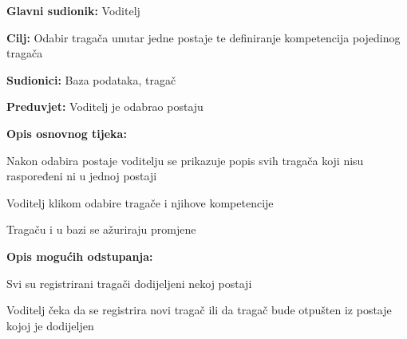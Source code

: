 					\noindent {}
					\begin{packed_item}
						
						\item \textbf{Glavni sudionik: } Voditelj
						\item  \textbf{Cilj:} Odabir tragača unutar jedne postaje te definiranje kompetencija pojedinog tragača
						\item  \textbf{Sudionici:} Baza podataka, tragač
						\item  \textbf{Preduvjet:} Voditelj je odabrao postaju
						\item  \textbf{Opis osnovnog tijeka:}
						
						\item[] \begin{packed_enum}
							
							\item Nakon odabira postaje voditelju se prikazuje popis svih tragača koji nisu raspoređeni ni u jednoj postaji
							\item Voditelj klikom odabire tragače i njihove kompetencije
							\item Tragaču i u bazi se ažuriraju promjene
						\end{packed_enum}
						
						\item  \textbf{Opis mogućih odstupanja:}
						
						\item[] \begin{packed_item}
							
							\item[2.a] Svi su registrirani tragači dodijeljeni nekoj postaji 
							\item[] \begin{packed_enum}
								
								\item  Voditelj čeka da se registrira novi tragač ili da tragač bude otpušten iz postaje kojoj je dodijeljen
								
								
							\end{packed_enum}
						
							
						\end{packed_item}
					\end{packed_item}
					
